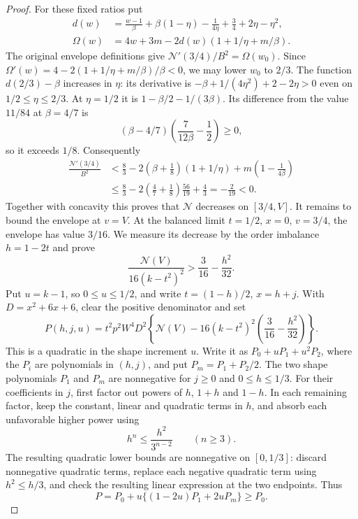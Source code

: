 \begin{proof}
For these fixed ratios put
\[
 \begin{split}
 d(w)&=\frac{w-1}{\beta}+\beta(1-\eta)-\frac1{4\eta}
             +\frac34+2\eta-\eta^2,\\
 \Omega(w)&=4w+3m-2d(w)(1+1/\eta+m/\beta).
 \end{split}
\]
The original envelope definitions give
$\mathcal N'(3/4)/B^2=\Omega(w_0)$.
Since $\Omega'(w)=4-2(1+1/\eta+m/\beta)/\beta<0$, we may lower $w_0$ to $2/3$.
The function $d(2/3)-\beta$ increases in $\eta$: its derivative is
$-\beta+1/(4\eta^2)+2-2\eta>0$ even on $1/2\le\eta\le2/3$.
At $\eta=1/2$ it is $1-\beta/2-1/(3\beta)$. Its difference from the value
$11/84$ at $\beta=4/7$ is
\[
 (\beta-4/7)\left(\frac7{12\beta}-\frac12\right)\ge0,
\]
so it exceeds $1/8$.
Consequently
\[
 \begin{split}
 \frac{\mathcal N'(3/4)}{B^2}
 &<\frac83-2(\beta+\tfrac18)(1+1/\eta)
                 +m\left(1-\frac1{4\beta}\right)\\
 &\le\frac83-2\left(\frac47+\frac18\right)\frac{56}{19}
                +\frac43=-\frac2{19}<0.
 \end{split}
\]
Together with concavity this proves that $\mathcal N$ decreases on $[3/4,V]$.
It remains to bound the envelope at $v=V$.
At the balanced limit $t=1/2$, $x=0$, $v=3/4$, the envelope has value $3/16$.
We measure its decrease by the order imbalance $h=1-2t$ and prove
\[
 \frac{\mathcal N(V)}{16(k-t^2)^2}>\frac3{16}-\frac{h^2}{32}.
\]
Put $u=k-1$, so $0\le u\le1/2$, and write $t=(1-h)/2$, $x=h+j$.
With $D=x^2+6x+6$, clear the positive denominator and set
\[
 P(h,j,u)=t^2p^2W^4D^2
 \left\{\mathcal N(V)-16(k-t^2)^2\left(\frac3{16}-\frac{h^2}{32}\right)\right\}.
\]
This is a quadratic in the shape increment $u$.
Write it as $P_0+uP_1+u^2P_2$, where the $P_i$ are polynomials in $(h,j)$,
and put $P_m=P_1+P_2/2$.
The two shape polynomials $P_1$ and $P_m$ are nonnegative for $j\ge0$ and
$0\le h\le1/3$. For their coefficients in $j$, first factor out powers of $h$,
$1+h$ and $1-h$. In each remaining factor, keep the constant, linear and quadratic
terms in $h$, and absorb each unfavorable higher power using
\[
 h^n\le\frac{h^2}{3^{n-2}}\qquad(n\ge3).
\]
The resulting quadratic lower bounds are nonnegative on $[0,1/3]$: discard
nonnegative quadratic terms, replace each negative quadratic term using $h^2\le h/3$,
and check the resulting linear expression at the two endpoints. Thus
\[
 P=P_0+u\{(1-2u)P_1+2uP_m\}\ge P_0.
\]


\end{proof}
